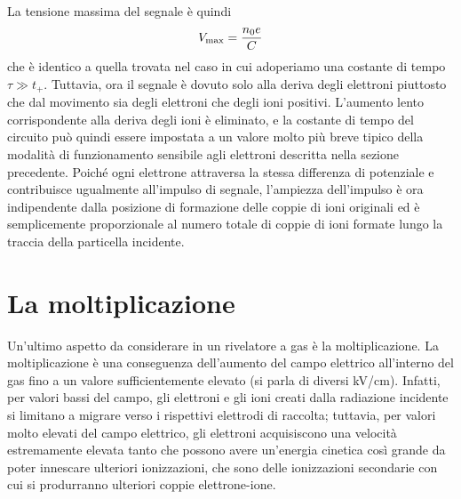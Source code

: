 \begin{approfondimento}
\begin{figure}[H]
   \end{figure}
   La tensione massima del segnale è quindi
   \begin{equation*}
      V_{\rm max}=\frac{n_0 e}{C}
   \end{equation*}
   che è identico a quella trovata nel caso in cui adoperiamo una costante di tempo $\tau \gg t_+$. Tuttavia, ora il segnale è dovuto solo alla deriva degli elettroni piuttosto che dal movimento sia degli elettroni che degli ioni positivi. L'aumento lento corrispondente alla deriva degli ioni è eliminato, e la costante di tempo del circuito può quindi essere impostata a un valore molto più breve tipico della modalità di funzionamento sensibile agli elettroni descritta nella sezione precedente. Poiché ogni elettrone attraversa la stessa differenza di potenziale e contribuisce ugualmente all'impulso di segnale, l'ampiezza dell'impulso è ora indipendente dalla posizione di formazione delle coppie di ioni originali ed è semplicemente proporzionale al numero totale di coppie di ioni formate lungo la traccia della particella incidente.
\end{approfondimento}

\vfill

\section{La moltiplicazione}

Un'ultimo aspetto da considerare in un rivelatore a gas è la moltiplicazione. La moltiplicazione è una conseguenza dell'aumento del campo elettrico all'interno del gas fino a un valore sufficientemente elevato (si parla di diversi kV/cm). Infatti, per valori bassi del campo, gli elettroni e gli ioni creati dalla radiazione incidente si limitano a migrare verso i rispettivi elettrodi di raccolta; tuttavia, per valori molto elevati del campo elettrico, gli elettroni acquisiscono una velocità estremamente elevata tanto che possono avere un'energia cinetica così grande da poter innescare ulteriori ionizzazioni, che sono delle ionizzazioni secondarie con cui si produrranno ulteriori coppie elettrone-ione.

